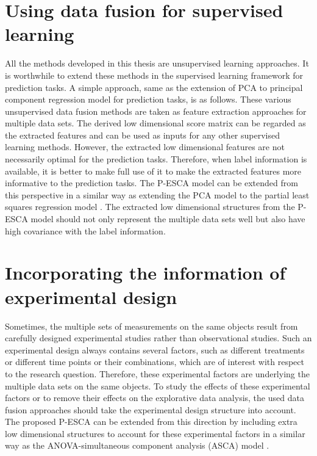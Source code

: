 \section{Using data fusion for supervised learning}
All the methods developed in this thesis are unsupervised learning approaches. It is worthwhile to extend these methods in the supervised learning framework for prediction tasks. A simple approach, same as the extension of PCA to principal component regression model for prediction tasks, is as follows. These various unsupervised data fusion methods are taken as feature extraction approaches for multiple data sets. The derived low dimensional score matrix can be regarded as the extracted features and can be used as inputs for any other supervised learning methods. However, the extracted low dimensional features are not necessarily optimal for the prediction tasks. Therefore, when label information is available, it is better to make full use of it to make the extracted features more informative to the prediction tasks. The P-ESCA model can be extended from this perspective in a similar way as extending the PCA model to the partial least squares regression model \cite{geladi1986partial}. The extracted low dimensional structures from the P-ESCA model should not only represent the multiple data sets well but also have high covariance with the label information.

\section{Incorporating the information of experimental design}
Sometimes, the multiple sets of measurements on the same objects result from carefully designed experimental studies rather than observational studies. Such an experimental design always contains several factors, such as different treatments or different time points or their combinations, which are of interest with respect to the research question. Therefore, these experimental factors are underlying the multiple data sets on the same objects. To study the effects of these experimental factors or to remove their effects on the explorative data analysis, the used data fusion approaches should take the experimental design structure into account. The proposed P-ESCA can be extended from this direction by including extra low dimensional structures to account for these experimental factors in a similar way as the ANOVA-simultaneous component analysis (ASCA) model \cite{smilde2005anova}.

